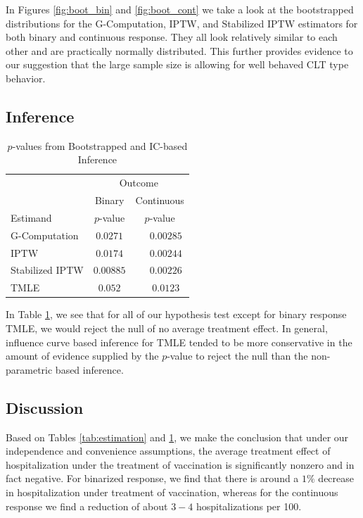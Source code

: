 \documentclass[english, 12pt]{article}
\begin{document}
In Figures \ref{fig:boot_bin} and \ref{fig:boot_cont} we take a look at the bootstrapped distributions for the G-Computation, IPTW, and Stabilized IPTW estimators for both binary and continuous response. They all look relatively similar to each other and are practically normally distributed. This further provides evidence to our suggestion that the large sample size is allowing for well behaved CLT type behavior.

\subsection{Inference}
\begin{table}[H]
\begin{center}
\begin{tabular}{lcc}
\toprule
 & \multicolumn{2}{c}{Outcome} \\ \cmidrule(lr){2-3}
 & \multicolumn{1}{c}{Binary} & \multicolumn{1}{c}{Continuous} \\ \cmidrule(lr){2-2}\cmidrule(lr){3-3}
Estimand  & $p$-value & $p$-value \\ 
\midrule
G-Computation  & $0.0271$ & $\phantom{-}0.00285$ \\
IPTW  & $0.0174$ & $\phantom{-}0.00244$ \\
Stabilized IPTW  & $0.00885$ & $\phantom{-}0.00226$ \\
TMLE & $0.052$ & $\phantom{-}0.0123$ \\
\bottomrule 
\end{tabular}
\caption{$p$-values from Bootstrapped and IC-based Inference}
\label{tab:inference}
\end{center}
\end{table}
In Table \ref{tab:inference}, we see that for all of our hypothesis test except for binary response TMLE, we would reject the null of no average treatment effect. In general, influence curve based inference for TMLE tended to be more conservative in the amount of evidence supplied by the $p$-value to reject the null than the non-parametric based inference. 

\subsection{Discussion}
Based on Tables \ref{tab:estimation} and \ref{tab:inference}, we make the conclusion that under our independence and convenience assumptions, the average treatment effect of hospitalization under the treatment of vaccination is significantly nonzero and in fact negative. For binarized response, we find that there is around a $1\%$ decrease in hospitalization under treatment of vaccination, whereas for the continuous response we find a reduction of about $3-4$ hospitalizations per 100.
\end{document}
